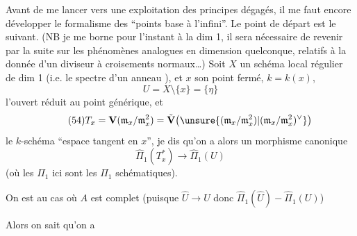 
Avant de me lancer vers une exploitation des principes dégagés, il me faut encore développer le formalisme des ``points base à l'infini''. Le point de départ est le suivant.  (NB je me borne pour l'instant à la dim 1,   il sera nécessaire de revenir par la suite sur les phénomènes analogues en dimension quelconque, relatifs à la donnée d'un diviseur à croisements normaux\ldots) Soit $X$ un schéma local régulier de dim 1 (i.e. le spectre d'un anneau  ), et $x$ son point fermé, $k=k(x)$,
\[
\tag{53} U=X\setminus\{x\}=\{\eta\}
\]
l'ouvert réduit au point générique, et
\[
\tag{54} T_x=\mathbf V(\mathfrak m_x/\mathfrak m_x^2)
=\check{\mathbf V}\bigl(\unsure{(\mathfrak m_x/\mathfrak m_x^2)|(\mathfrak m_x/\mathfrak m_x^2)^\vee}\bigr)
\]
le $k$-schéma ``espace tangent en $x$'',  je dis qu'on a alors un morphisme canonique
\[
\tag{55} \widehat\Pi_1(T_x^*)\longrightarrow\widehat\Pi_1(U)
\]
(où les $\widehat\Pi_1$ ici sont les $\Pi_1$ schématiques).

On est   au cas où $A$ est  complet  (puisque $\widehat U\longrightarrow U$ donc $\widehat\Pi_1(\widehat U)\mathrel{-}\widehat\Pi_1(U)$)

Alors on sait qu'on a \unsure{!|:}


